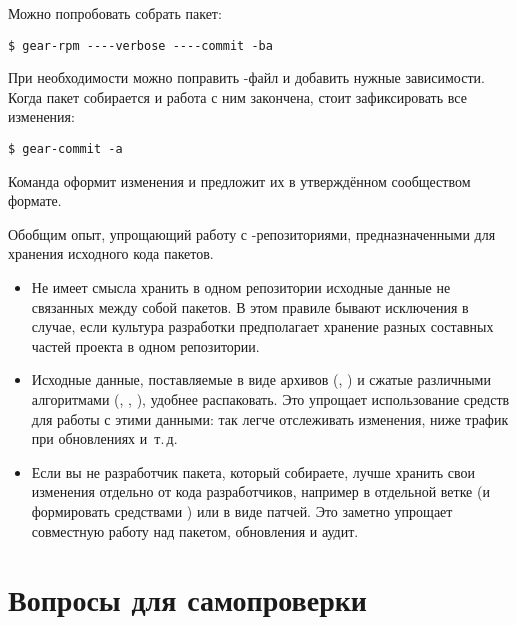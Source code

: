 Можно попробовать собрать пакет:
\begin{verbatim}
$ gear-rpm ----verbose ----commit -ba
\end{verbatim}

При необходимости можно поправить -файл и добавить нужные зависимости.
Когда пакет собирается и работа с ним закончена, стоит зафиксировать все изменения:
\begin{verbatim}
$ gear-commit -a
\end{verbatim}
Команда оформит изменения и предложит их в утверждённом сообществом формате.

Обобщим опыт, упрощающий работу с -репозиториями, предназначенными для хранения исходного кода пакетов.

\begin{itemize}
	\item {}

	Не имеет смысла хранить в одном репозитории исходные данные не связанных между собой пакетов.
		В этом правиле бывают исключения в случае, если культура разработки предполагает хранение
		разных составных частей проекта в одном репозитории.
	\item  {}

	Исходные данные, поставляемые в виде архивов (, ) и сжатые различными
		алгоритмами (, , ), удобнее распаковать. Это упрощает
		использование средств  для работы с этими данными: так легче отслеживать изменения,
		ниже трафик при обновлениях и~т.\,д.
	\item {}

	Если вы не разработчик пакета, который собираете, лучше хранить свои изменения отдельно
		от кода разработчиков, например в отдельной ветке (и формировать  средствами )
		или в виде патчей. Это заметно упрощает совместную работу над пакетом, обновления и аудит.
\end{itemize}
\section{Вопросы для самопроверки}

